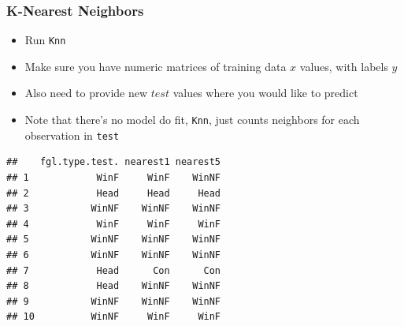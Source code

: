 \documentclass[
  shownotes,
  xcolor={svgnames},
  hyperref={colorlinks,citecolor=DarkBlue,linkcolor=DarkRed,urlcolor=DarkBlue}
  , aspectratio=169]{beamer}
\newenvironment{Shaded}{\begin{snugshade}}{\end{snugshade}}
\newcommand{\DataTypeTok}[1]{\textcolor[rgb]{0.13,0.29,0.53}{#1}}
\newcommand{\DecValTok}[1]{\textcolor[rgb]{0.00,0.00,0.81}{#1}}
\newcommand{\KeywordTok}[1]{\textcolor[rgb]{0.13,0.29,0.53}{\textbf{#1}}}
\newcommand{\NormalTok}[1]{#1}
\newcommand{\OperatorTok}[1]{\textcolor[rgb]{0.81,0.36,0.00}{\textbf{#1}}}
\newcommand{\StringTok}[1]{\textcolor[rgb]{0.31,0.60,0.02}{#1}}
\begin{document}
\begin{frame}[fragile]
\frametitle{K-Nearest Neighbors}

\begin{itemize}
  \item Run \texttt{Knn}
  \item Make sure you have numeric matrices of training data $x$ values, with labels $y$
  \item Also need to provide new $test$ values where you would like to predict
  \item Note that there's no model do fit, \texttt{Knn}, just counts neighbors for each observation in \texttt{test}
\end{itemize}
\begin{scriptsize}
\begin{Shaded}
\end{Shaded}
\end{scriptsize}
\begin{tiny}

\begin{verbatim}
##    fgl.type.test. nearest1 nearest5
## 1            WinF     WinF    WinNF
## 2            Head     Head     Head
## 3           WinNF    WinNF    WinNF
## 4            WinF     WinF     WinF
## 5           WinNF    WinNF    WinNF
## 6           WinNF    WinNF    WinNF
## 7            Head      Con      Con
## 8            Head    WinNF    WinNF
## 9           WinNF    WinNF    WinNF
## 10          WinNF     WinF     WinF
\end{verbatim}
\end{tiny}
\end{frame}
\end{document}
